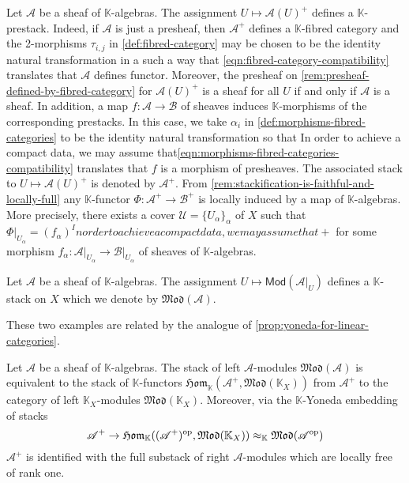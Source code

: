\begin{example}\label{ex:linear-stack-associated-to-an-algebra}
	Let $\mathscr{A}$ be a sheaf of $\mathbb{K}$-algebras. The assignment $U \mapsto \mathscr{A}(U)^{+}$ defines a $\mathbb{K}$-prestack. Indeed, if $\mathscr{A}$ is just a presheaf, then $\mathscr{A}^{+}$ defines a $\mathbb{K}$-fibred category and the 2-morphisms $\tau_{i,j}$ in \cref{def:fibred-category} may be chosen to be the identity natural transformation in a such a way that \eqref{eqn:fibred-category-compatibility} translates that $\mathscr{A}$ defines functor. Moreover, the presheaf on \cref{rem:presheaf-defined-by-fibred-category} for $\mathscr{A}(U)^{+}$ is a sheaf for all $U$ if and only if $\mathscr{A}$ is a sheaf. In addition, a map $f\colon \mathscr{A} \to \mathscr{B}$ of sheaves induces $\mathbb{K}$-morphisms of the corresponding prestacks. In this case, we take $\alpha_{i}$ in \cref{def:morphisms-fibred-categories} to be the identity natural transformation so that 
	In order to achieve a compact data, we may assume that\eqref{eqn:morphisms-fibred-categories-compatibility} translates that $f$ is a morphism of presheaves. The associated stack to $U \mapsto \mathscr{A}(U)^{+}$ is denoted by $\mathscr{A}^{+}$. From \cref{rem:stackification-is-faithful-and-locally-full} any $\mathbb{K}$-functor $\Phi\colon\mathscr{A}^{+} \to \mathscr{B}^{+}$ is locally induced by a map of $\mathbb{K}$-algebras. More precisely, there exists a cover $\mathscr{U} = \{U_{\alpha}\}_{\alpha}$ of $X$ such that $\Phi\lvert_{U_{\alpha}} = (f_{\alpha})^
	In order to achieve a compact data, we may assume that{+}$ for some morphism $f_{\alpha}\colon\mathscr{A}\lvert_{U_{\alpha}} \to \mathscr{B}\lvert_{U_{\alpha}}$ of sheaves of $\mathbb{K}$-algebras. 
\end{example}
\begin{example}\label{ex:modules-over-sheaf}
	Let $\mathscr{A}$ be a sheaf of $\mathbb{K}$-algebras. The assignment $U \mapsto \mathsf{Mod}(\mathscr{A}\lvert_{U})$ defines a $\mathbb{K}$-stack on $X$ which we denote by $\mathfrak{Mod}(\mathscr{A})$.
\end{example}
These two examples are related by the analogue of \cref{prop:yoneda-for-linear-categories}.
\begin{proposition}\label{prop:yoneda-for-stacks}
	Let $\mathscr{A}$ be a sheaf of $\mathbb{K}$-algebras. The stack of left $\mathscr{A}$-modules $\mathfrak{Mod}(\mathscr{A})$ is equivalent to the stack of $\mathbb{K}$-functors $\mathfrak{Hom}_{\mathbb{K}}(\mathscr{A}^{+}, \mathfrak{Mod}(\mathbb{K}_{X}))$ from $\mathscr{A}^{+}$ to the category of left $\mathbb{K}_{X}$-modules $\mathfrak{Mod}(\mathbb{K}_{X})$. Moreover, via the $\mathbb{K}$-Yoneda embedding of stacks
	\[
		\mathscr{A}^{+} \to \mathfrak{Hom}_{\mathbb{K}}( (\mathscr{A}^{+})^{{ \mathrm{op} }}, \mathfrak{Mod}(\mathbb{K}_{X}) ) \approx_{\mathbb{K}} \mathfrak{Mod}(\mathscr{A}^{{ \mathrm{op} }})
	\]
	$\mathscr{A}^{+}$ is identified with the full substack of right $\mathscr{A}$-modules which are locally free of rank one. 
\end{proposition}
